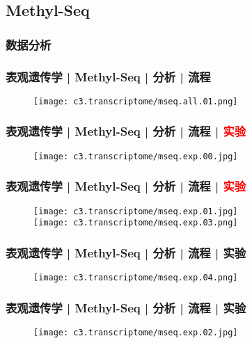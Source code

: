 \subsection{Methyl-Seq}
\subsubsection{数据分析}
\begin{frame}
  \frametitle{表观遗传学 | Methyl-Seq | 分析 | 流程}
  \begin{figure}
    \centering
    \texttt{[image: c3.transcriptome/mseq.all.01.png]}
  \end{figure}
\end{frame}

\begin{frame}
  \frametitle{表观遗传学 | Methyl-Seq | 分析 | 流程 | \textcolor{red}{实验}}
  \begin{figure}
    \centering
    \texttt{[image: c3.transcriptome/mseq.exp.00.jpg]}
  \end{figure}
\end{frame}

\begin{frame}
  \frametitle{表观遗传学 | Methyl-Seq | 分析 | 流程 | \textcolor{red}{实验}}
  \begin{figure}
    \centering
    \texttt{[image: c3.transcriptome/mseq.exp.01.jpg]}\\
    \vspace{1em}
    \texttt{[image: c3.transcriptome/mseq.exp.03.png]}
  \end{figure}
\end{frame}

\begin{frame}
  \frametitle{表观遗传学 | Methyl-Seq | 分析 | 流程 | 实验}
  \begin{figure}
    \centering
    \texttt{[image: c3.transcriptome/mseq.exp.04.png]}
  \end{figure}
\end{frame}

\begin{frame}
  \frametitle{表观遗传学 | Methyl-Seq | 分析 | 流程 | 实验}
  \begin{figure}
    \centering
    \texttt{[image: c3.transcriptome/mseq.exp.02.jpg]}
  \end{figure}
\end{frame}

